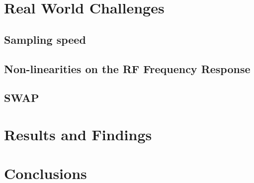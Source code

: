 \documentclass{article}
\begin{document}
\section{Real World Challenges}
\subsection{Sampling speed}
\subsection{Non-linearities on the RF Frequency Response}
\subsection{SWAP}

\section{Results and Findings}

\section{Conclusions}



\end{document}
